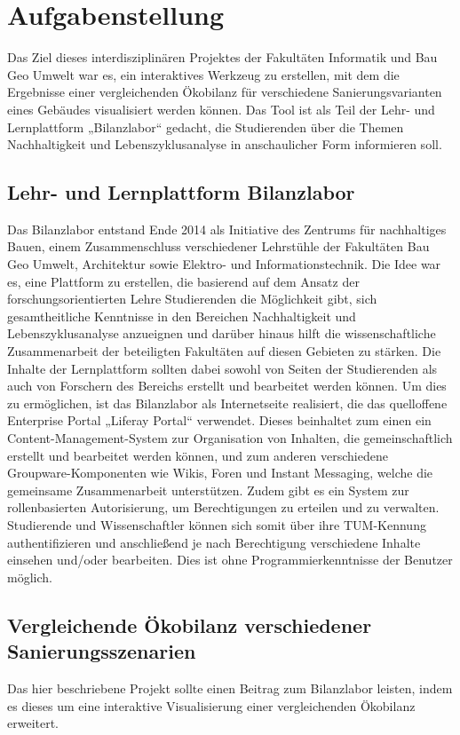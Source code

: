 
\chapter{Aufgabenstellung}
Das Ziel dieses interdisziplinären Projektes der Fakultäten Informatik und Bau Geo Umwelt war es, ein interaktives Werkzeug zu erstellen, mit dem die Ergebnisse einer vergleichenden Ökobilanz für verschiedene Sanierungsvarianten eines Gebäudes visualisiert werden können. Das Tool ist als Teil der Lehr- und Lernplattform „Bilanzlabor“ gedacht, die Studierenden über die Themen Nachhaltigkeit und Lebenszyklusanalyse in anschaulicher Form informieren soll.
\section{Lehr- und Lernplattform Bilanzlabor}
Das Bilanzlabor entstand Ende 2014 als Initiative des Zentrums für nachhaltiges Bauen, einem Zusammenschluss verschiedener Lehrstühle der Fakultäten Bau Geo Umwelt, Architektur sowie Elektro- und Informationstechnik. Die Idee war es, eine Plattform zu erstellen, die basierend auf dem Ansatz der forschungsorientierten Lehre Studierenden die Möglichkeit gibt, sich gesamtheitliche Kenntnisse in den Bereichen Nachhaltigkeit und Lebenszyklusanalyse anzueignen und darüber hinaus hilft die wissenschaftliche Zusammenarbeit der beteiligten Fakultäten auf diesen Gebieten zu stärken. Die Inhalte der Lernplattform sollten dabei sowohl von Seiten der Studierenden als auch von Forschern des Bereichs erstellt und bearbeitet werden können. Um dies zu ermöglichen, ist das Bilanzlabor als Internetseite realisiert, die das quelloffene Enterprise Portal „Liferay Portal“ verwendet. Dieses beinhaltet zum einen ein Content-Management-System zur Organisation von Inhalten, die gemeinschaftlich erstellt und bearbeitet werden können, und zum anderen verschiedene Groupware-Komponenten wie Wikis, Foren und Instant Messaging, welche die gemeinsame Zusammenarbeit unterstützen. Zudem gibt es ein System zur rollenbasierten Autorisierung, um Berechtigungen zu erteilen und zu verwalten. Studierende und Wissenschaftler können sich somit über ihre TUM-Kennung authentifizieren und anschließend je nach Berechtigung verschiedene Inhalte einsehen und/oder bearbeiten. Dies ist ohne Programmierkenntnisse der Benutzer möglich.
\section{Vergleichende Ökobilanz verschiedener Sanierungsszenarien}
Das hier beschriebene Projekt sollte einen Beitrag zum Bilanzlabor leisten, indem es dieses um eine interaktive Visualisierung einer vergleichenden Ökobilanz erweitert. 
